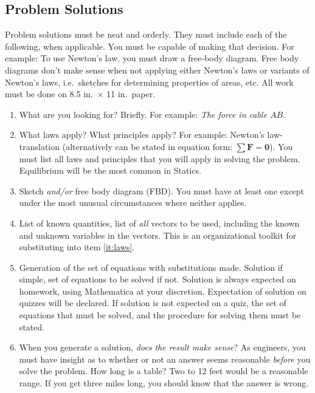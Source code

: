 \documentclass[10pt]{article}
\begin{document}
\subsection*{Problem Solutions}
Problem solutions must be neat and orderly.  They must include each of the following, when applicable.  You must be capable of making that decision.  For example: To use Newton's law, you must draw a free-body diagram.  Free body diagrams don't make sense when not applying either Newton's laws or variants of Newton's laws, i.e.~sketches for determining properties of areas, etc. All work must be done on 8.5  in.~$\times$ 11 in.~paper.
\begin{enumerate}
        \item What are you looking for?  Briefly.  For example: \emph{The force in
        cable $AB$}.

        \item \label{it:laws} What laws apply?  What principles apply?  For
        example: Newton's law-translation (alternatively can be stated in
        equation form: $\sum{\mathbf{F}}=\mathbf{0}$).  You must list all laws
        and principles that you will apply in solving the problem. 
        Equilibrium will be the most common in Statics.

        \item Sketch \emph{and/or} free body diagram (FBD).  You must have at
        least one except under the most unusual circumstances where neither applies.

        \item List of known quantities, list of \emph{all} vectors to be used,
        including the known and unknown variables in the vectors.  This is an
        organizational toolkit for substituting into item \ref{it:laws}.

        \item Generation of the set of equations with substitutions made. 
        Solution if simple, set of equations to be solved if not.  Solution is
        always expected on homework, using Mathematica at your discretion. 
        Expectation of solution on quizzes will be declared.  If solution is
        not expected on a quiz, the set of equations that must be solved, and
        the procedure for solving them must be stated.

        \item When you generate a solution, \emph{does the result make sense}? 
        As engineers, you must have insight as to whether or not an answer
        seems reasonable \emph{before} you solve the problem.  How long is a
        table?  Two to 12 feet would be a reasonable range.  If you get three
        miles long, you should know that the answer is wrong.
\end{enumerate}
\end{document}

